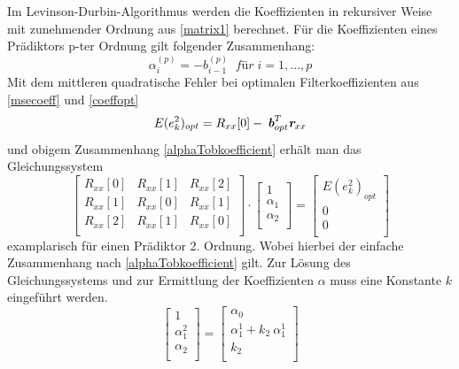 \documentclass[
    10pt, %
    DIV12,
    english, %
    a5paper, %
    twoside, %
    titlepage, %
    parskip=half, %
    headings=small, %
    listof=totoc, %
    bibliography=totoc, %
    index=totoc, %
    captions=tableheading, %
    final %
]{scrbook}
\begin{document}
Im Levinson-Durbin-Algorithmus werden die Koeffizienten in rekursiver Weise mit zunehmender Ordnung aus \eqref{matrix1} berechnet. 
Für die Koeffizienten eines Prädiktors p-ter Ordnung gilt folgender Zusammenhang:
\begin{equation}\label{alphaTobkoefficient}
\alpha_i^{(p)}=-b_{i-1}^{(p)}\;\;für\;i=1,...,p
\end{equation}
Mit dem mittleren quadratische Fehler bei optimalen Filterkoeffizienten aus \eqref{msecoeff} und  \eqref{coeffopt}
\begin{equation}\label{}
E(e_k^2)_{opt}=R_{xx}[0]-\:\textit{\textbf{b}}_{opt}^T\textit{\textbf{r}}_{xx}
\end{equation}
und obigem Zusammenhang \eqref{alphaTobkoefficient} erhält man das Gleichungssystem 
\begin{equation}\label{matrix2}
\begin{bmatrix} 
R_{xx}[0] & R_{xx}[1] & R_{xx}[2]\\
R_{xx}[1] & R_{xx}[0] & R_{xx}[1]\\
R_{xx}[2] & R_{xx}[1] & R_{xx}[0]\\
\end{bmatrix} 
\cdot
\begin{bmatrix} 
1\\
\alpha_1\\
\alpha_2\\
\end{bmatrix} 
=
\begin{bmatrix} 
E(e_k^2)_{opt}\\
0\\
0\\
\end{bmatrix} \nonumber
\end{equation}
examplarisch für einen Prädiktor 2. Ordnung. Wobei hierbei der einfache Zusammenhang nach \eqref{alphaTobkoefficient} gilt. 
Zur Lösung des Gleichungssystems und zur Ermittlung der Koeffizienten $\alpha$ muss eine Konstante $k$ eingeführt werden. 
\begin{equation}\label{solvingabyk}
\begin{bmatrix} 
1\\
\alpha_1^{2}\\
\alpha_2\\
\end{bmatrix} 
=
\begin{bmatrix} 
\alpha_0\\
\alpha_1^{1}+k_2\:\alpha_1^{1}\\
k_2\\
\end{bmatrix} \nonumber
\end{equation}
\end{document}
